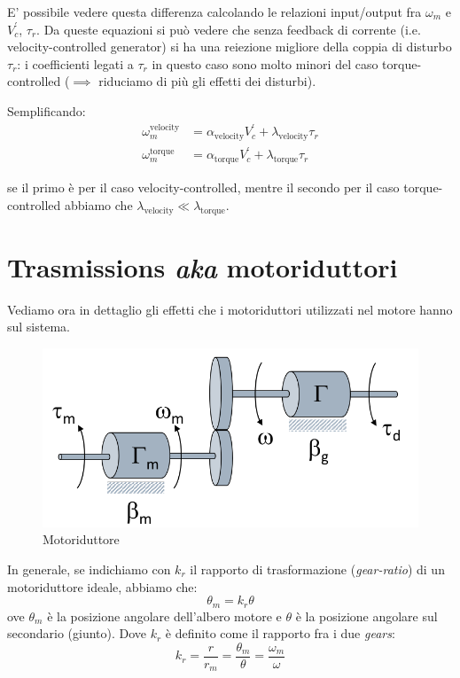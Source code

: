 E' possibile vedere questa differenza calcolando le relazioni input/output fra $\omega_m$ e $V^{'}_c$, $\tau_r$. Da queste equazioni si può vedere che senza feedback di corrente (i.e. velocity-controlled generator) si ha una reiezione migliore della coppia di disturbo $\tau_r$: i coefficienti legati a $\tau_r$ in questo caso sono molto minori del caso torque-controlled ($\implies$ riduciamo di più gli effetti dei disturbi).

Semplificando:
\begin{align}
\omega_m^{\text{velocity}} &= \alpha_{\text{velocity}} V^{'}_c + \lambda_{\text{velocity}}\tau_r \\
\omega_m^{\text{torque}} &= \alpha_{\text{torque}} V^{'}_c + \lambda_{\text{torque}}\tau_r
\end{align}

se il primo è per il caso velocity-controlled, mentre il secondo per il caso torque-controlled abbiamo che $\lambda_{\text{velocity}} \ll \lambda_{\text{torque}}$.







\section{Trasmissions {\small \textit{aka}} motoriduttori}
Vediamo ora in dettaglio gli effetti che i motoriduttori utilizzati nel motore hanno sul sistema.

\begin{figure}[th!]
	\centering
	\includegraphics[width=0.5\linewidth]{images/trasmission_1}
	\caption{Motoriduttore}
	\label{fig:trasmission1}
\end{figure}


In generale, se indichiamo con $k_r$ il rapporto di trasformazione (\textit{gear-ratio}) di un motoriduttore ideale, abbiamo che:
$$
\theta_m = k_r\theta
$$
ove $\theta_m$ è la posizione angolare dell’albero motore e $\theta$ è la posizione angolare sul secondario (giunto). Dove $k_r$ è definito come il rapporto fra i due \textit{gears}:
$$
k_r = \frac{r}{r_m} = \frac{\theta_m}{\theta} = \frac{\omega_m}{\omega}
$$

